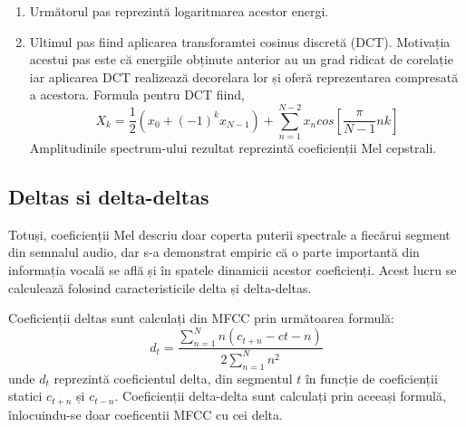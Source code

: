\documentclass[a4paper,12pt]{book}
\begin{document}
\begin{enumerate}
\begin{equation*}
\begin{cases}
							\frac{k-f(m-1)}{f(m) - f(m-1)}&\quad f(m-1)\leq k\leq f(m) \\[5pt]
							\frac{f(m+1)-k}{f(m+1) - f(m)}&\quad f(m)\leq k\leq f(m+1) \\[3pt]
							\quad \quad 0&\quad k>f(m+1)
							\end{cases}
						\end{equation*}
						unde $m$ este numărul frecvenței scalate, iar $k$ este frecvența curentă din spectrum. \newline
						Filtrele triunghiulare sunt înmulțite apoi cu "power spectrum"-ul obținut la pasul anterior și se obțin astfel energiile din fiecare filtru Mel.
						\item Următorul pas reprezintă logaritmarea acestor energi.
						\item Ultimul pas fiind aplicarea transforamtei cosinus discretă (DCT). Motivația acestui pas este că energiile obținute anterior au un grad ridicat de corelație iar aplicarea DCT realizează decorelara lor și oferă reprezentarea compresată a acestora.
						Formula pentru DCT fiind,
						\begin{equation*}
							X_k = \frac{1}{2}(x_0 + (-1)^k x_{N-1}) + \sum_{n=1}^{N-2} x_n cos[\frac{\pi}{N-1}nk]
						\end{equation*}
						Amplitudinile spectrum-ului rezultat reprezintă coeficienții Mel cepstrali.
				\end{enumerate} \par
				\subsection{Deltas si delta-deltas}
					Totuși, coeficienții Mel descriu doar coperta puterii spectrale a fiecărui segment din semnalul audio, dar s-a demonstrat empiric că o parte importantă din informația vocală se află și în spatele dinamicii acestor coeficienți. Acest lucru se calculează folosind caracteristicile delta și delta-deltas. \par Coeficienții deltas sunt calculați din MFCC prin următoarea formulă:
					\begin{equation*}
						d_t = \frac{\sum_{n=1}^{N} n(c_{t+n}-c{t-n})}{2\sum_{n=1}^{N}n^2}
					\end{equation*}
					unde $d_t$ reprezintă coeficientul delta, din segmentul $t$  în funcție de coeficienții statici $c_{t+n}$ și $c_{t-n}$. 
					Coeficienții delta-delta sunt calculați prin aceeași formulă, înlocuindu-se doar coeficentii MFCC cu cei delta. \par
				
\end{document}

